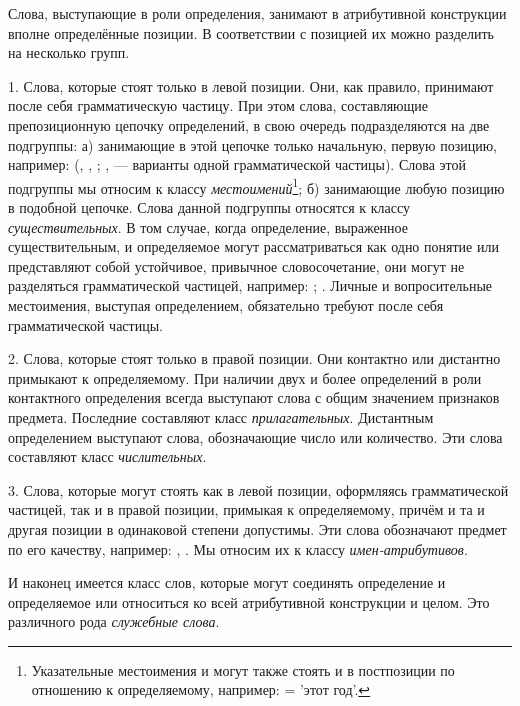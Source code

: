 Слова, выступающие в роли определения, занимают в атрибутивной конструкции вполне определённые позиции. В соответствии с позицией их можно разделить на несколько групп.

1. Слова, которые стоят только в левой позиции. Они, как правило, принимают после себя грамматическую частицу. При этом слова, составляющие препозиционную цепочку определений, в свою очередь подразделяются на две подгруппы:
а) занимающие в этой цепочке только начальную, первую позицию, например:  (, , ; ,  --- варианты одной грамматической частицы). Слова этой подгруппы мы относим к классу \emph{местоимений}\footnote[24]{Указательные местоимения  и  могут также стоять и в постпозиции по отношению к определяемому, например:  =  'этот год'.};
б) занимающие любую позицию в подобной цепочке. Слова данной подгруппы относятся к классу \emph{существительных}. В том случае, когда определение, выраженное существительным, и определяемое могут рассматриваться как одно понятие или представляют собой устойчивое, привычное словосочетание, они могут не разделяться грамматической частицей, например:
;
. Личные и вопросительные местоимения, выступая определением, обязательно требуют после себя грамматической частицы.

2. Слова, которые стоят только в правой позиции. Они контактно или дистантно примыкают к определяемому. При наличии двух и более определений в роли контактного определения всегда выступают слова с общим значением признаков предмета. Последние составляют класс \emph{прилагательных}. Дистантным определением выступают слова, обозначающие число или количество. Эти слова составляют класс \emph{числительных}.

3. Слова, которые могут стоять как в левой позиции, оформляясь грамматической частицей, так и в правой позиции, примыкая к определяемому, причём и та и другая позиции в одинаковой степени допустимы. Эти слова обозначают предмет по его качеству, например:
, .
Мы относим их к классу \emph{имен-атрибутивов}.

И наконец имеется класс слов, которые могут соединять определение и определяемое или относиться ко всей атрибутивной конструкции и целом. Это различного рода \emph{служебные слова}.

